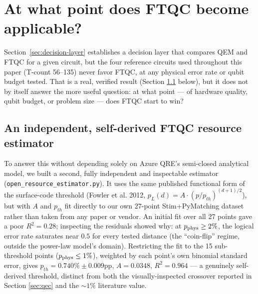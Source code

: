 \documentclass[9pt,twocolumn]{extarticle}
\begin{document}
\section{At what point does FTQC become applicable?}
\label{sec:crossover}
Section~\ref{sec:decision-layer} establishes a decision layer that compares
QEM and FTQC for a given circuit, but the four reference circuits used
throughout this paper (T-count 56--135) never favor FTQC, at any physical
error rate or qubit budget tested. That is a real, verified result (Section
\ref{sec:tools-open-estimator} below), but it does not by itself answer the
more useful question: at what point --- of hardware quality, qubit budget,
or problem size --- does FTQC start to win?

\subsection{An independent, self-derived FTQC resource estimator}
\label{sec:tools-open-estimator}
To answer this without depending solely on Azure QRE's semi-closed
analytical model, we built a second, fully independent and inspectable
estimator (\texttt{open\_resource\_estimator.py}). It uses the same
published functional form of the surface-code threshold (Fowler et al.
2012, $p_L(d) = A \cdot (p/p_{th})^{(d+1)/2}$), but with $A$ and $p_{th}$
fit directly to our own 27-point Stim+PyMatching dataset rather than taken
from any paper or vendor. An initial fit over all 27 points gave a poor
$R^2=0.28$; inspecting the residuals showed why: at $p_{\rm phys}\ge2\%$,
the logical error rate saturates near $0.5$ for every tested distance (the
``coin-flip'' regime, outside the power-law model's domain). Restricting
the fit to the 15 sub-threshold points ($p_{\rm phys}\le1\%$), weighted by
each point's own binomial standard error, gives $p_{th}=0.740\%\pm0.009$pp,
$A=0.0348$, $R^2=0.964$ --- a genuinely self-derived threshold, distinct
from both the visually-inspected crossover reported in Section
\ref{sec:qec} and the $\sim1\%$ literature value.
\end{document}
